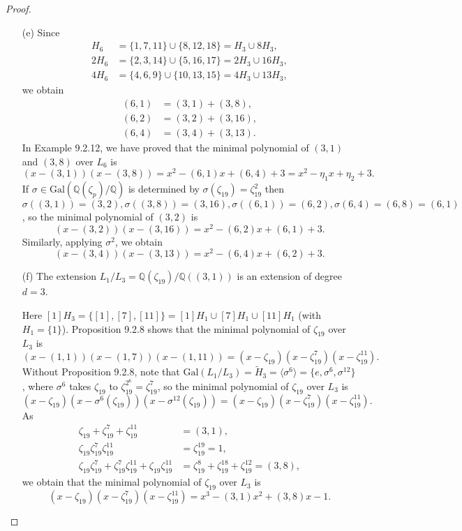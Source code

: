\documentclass[11pt,a4paper]{article}
\newcommand{\Q}{\mathbb{Q}}
\newcommand{\Gal}{\mathrm{Gal}}
\begin{document}
\begin{proof}
\begin{enumerate}
\item[(e)]
Since
\begin{align*}
H_6 &= \{1,7,11\} \cup \{8,12,18\} = H_3 \cup 8 H_3,\\
2H_6 &=\{2,3,14\} \cup \{5,16,17\} = 2H_3 \cup 16H_3,\\
4H_6 &= \{4,6,9\} \cup \{10,13,15\} = 4H_3 \cup13H_3,
\end{align*}
we obtain
\begin{align*}
(6,1) &= (3,1) + (3,8),\\
(6,2) &= (3,2) + (3,16),\\
(6,4) &= (3,4) + (3,13).
\end{align*}
In Example 9.2.12, we have proved that the minimal polynomial of $(3,1)$ and $(3,8)$ over $L_6$ is
$$(x-(3,1))(x-(3,8)) = x^2 - (6,1)x + (6,4)+3 = x^2 - \eta_1 x + \eta_2 + 3.$$
If $\sigma  \in \Gal(\Q(\zeta_p)/\Q)$ is determined by $\sigma(\zeta_{19})= \zeta_{19}^2$ then $\sigma((3,1)) = (3,2),\sigma((3,8)) = (3,16) ,\sigma((6,1)) = (6,2),\sigma(6,4) = (6,8)=(6,1)$, so the minimal polynomial of $(3,2)$ is
$$(x-(3,2))(x-(3,16)) = x^2 - (6,2)x +(6,1)+3.$$
Similarly, applying $\sigma^2$, we obtain
$$(x-(3,4))(x-(3,13)) = x^2 - (6,4) x +(6,2)+3.$$


\item[(f)] The extension $L_1/L_3 = \Q(\zeta_{19})/\Q((3,1))$ is an extension of degree $d=3$. 

Here $[1]H_3 = \{[1],[7],[11]\} = [1]H_{1} \cup [7] H_{1} \cup [11] H_{1}$ (with $H_1=\{1\}$). Proposition 9.2.8 shows that the minimal polynomial of $\zeta_{19}$ over $L_3$ is
$$( x- (1,1))(x-(1,7))(x-(1,11)) = (x-\zeta_{19})(x-\zeta_{19}^7)(x- \zeta_{19}^{11}).$$
Without Proposition 9.2.8, note that $\Gal(L_1/L_3) = \tilde{H}_3 =  \langle \sigma^6 \rangle = \{e, \sigma^6, \sigma^{12}\}$, where $\sigma^6$ takes $\zeta_{19}$ to $\zeta_{19}^{2^6} = \zeta_{19}^7$, so the minimal polynomial of $\zeta_{19}$ over $L_3$ is
$$(x-\zeta_{19})(x-\sigma^6(\zeta_{19}))(x- \sigma^{12}(\zeta_{19})) = (x-\zeta_{19})(x-\zeta_{19}^7)(x- \zeta_{19}^{11}).$$
As 
\begin{align*}
\zeta_{19}+ \zeta_{19}^7+\zeta_{19}^{11} &= (3,1),\\
\zeta_{19} \zeta_{19}^7\zeta_{19}^{11} &= \zeta_{19}^{19} = 1,\\
\zeta_{19} \zeta_{19}^7+\zeta_{19}^7\zeta_{19}^{11}+\zeta_{19}\zeta_{19}^{11}  &= \zeta_{19}^8 + \zeta_{19}^{18}+ \zeta_{19}^{12} = (3,8),
\end{align*}
we obtain that the minimal polynomial of $\zeta_{19}$ over $L_3$ is
$$ (x-\zeta_{19})(x-\zeta_{19}^7)(x- \zeta_{19}^{11}) = x^3-(3,1)x^2+(3,8)x-1.$$

\end{enumerate}
\end{proof}
\end{document}
